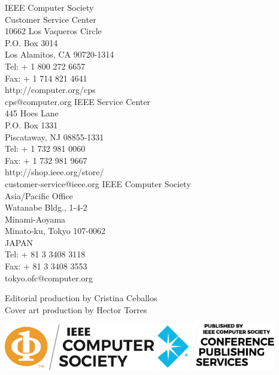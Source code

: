 \documentclass[12pt,a4,twosides]{book}
\begin{document}
\begin{center}
\begin{multicols}{3}
IEEE Computer Society\\
Customer Service Center\\
10662 Los Vaqueros Circle\\
P.O. Box 3014\\
Los Alamitos, CA 90720-1314\\
Tel: + 1 800 272 6657\\
Fax: + 1 714 821 4641\\
http://computer.org/cps\\
cps@computer.org
\columnbreak
IEEE Service Center\\
445 Hoes Lane\\
P.O. Box 1331\\
Piscataway, NJ 08855-1331\\
Tel: + 1 732 981 0060\\
Fax: + 1 732 981 9667\\
http://shop.ieee.org/store/\\
customer-service@ieee.org
\columnbreak
IEEE Computer Society\\
Asia/Pacific Office\\
Watanabe Bldg., 1-4-2\\
Minami-Aoyama\\
Minato-ku, Tokyo 107-0062\\
JAPAN\\
Tel: + 81 3 3408 3118\\
Fax: + 81 3 3408 3553\\
tokyo.ofc@computer.org
\end{multicols}
\end{center}

\begin{center}
Editorial production by Cristina Ceballos\\
Cover art production by Hector Torres
\end{center}

\begin{center}
\begin{multicols}{2}
\includegraphics[height=0.8in]{../images/ieee-cs-logo}
\columnbreak
\includegraphics[height=0.8in]{../images/ieee-cps-logo}
\end{multicols}
\end{center}
\end{document}
